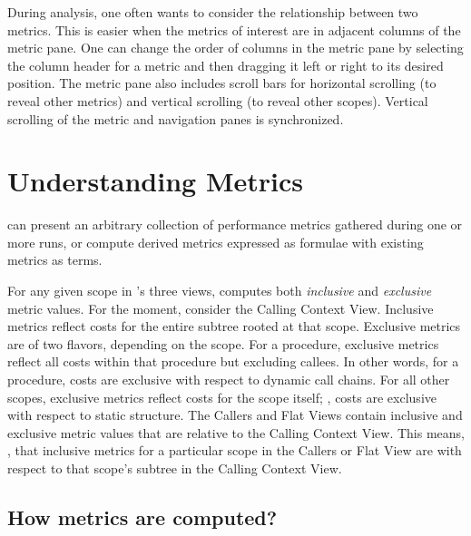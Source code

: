 During analysis, one often wants to consider the relationship between two metrics.
This is easier when the metrics of interest are in adjacent columns of the metric pane.
One can change the order of columns in the metric pane by selecting the column header for a metric and then dragging it left or right to its desired position.
The metric pane also includes scroll bars for horizontal scrolling (to reveal other metrics) and vertical scrolling (to reveal other scopes).
Vertical scrolling of the metric and navigation panes is synchronized.



\section{Understanding Metrics}

\hpcviewer{} can present an arbitrary collection of performance metrics gathered during one or more runs, or compute derived metrics expressed as formulae with existing metrics as terms.

For any given scope in \hpcviewer{}'s three views, \hpcviewer{} computes both \emph{inclusive} and \emph{exclusive} metric values.
For the moment, consider the Calling Context View.
Inclusive metrics reflect costs for the entire subtree rooted at that scope.
Exclusive metrics are of two flavors, depending on the scope.
For a procedure, exclusive metrics reflect all costs within that procedure but excluding callees.
In other words, for a procedure, costs are exclusive with respect to dynamic call chains.
For all other scopes, exclusive metrics reflect costs for the scope itself; \ie{}, costs are exclusive with respect to static structure.
The Callers and Flat Views contain inclusive and exclusive metric values that are relative to the Calling Context View.
This means, \eg{}, that inclusive metrics for a particular scope in the Callers or Flat View are with respect to that scope's subtree in the Calling Context View.



\subsection{How metrics are computed?}

